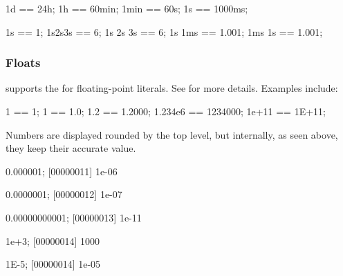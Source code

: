 \begin{urbiassert}
1d == 24h;
1h == 60min;
1min == 60s;
1s == 1000ms;

1s == 1;
1s2s3s == 6;
1s 2s 3s == 6;
1s 1ms == 1.001;
1ms 1s == 1.001;
\end{urbiassert}

\subsubsection{Floats}
\label{sec:us-syn-lit-float}

\us supports the  for floating-point
literals.  See  for more details.  Examples include:


\begin{urbiassert}
            1 == 1;
            1 == 1.0;
          1.2 == 1.2000;
      1.234e6 == 1234000;
        1e+11 == 1E+11;
\end{urbiassert}

Numbers are displayed rounded by the top level, but internally, as
seen above, they keep their accurate value.

\begin{urbiscript}
0.000001;
[00000011] 1e-06

0.0000001;
[00000012] 1e-07

0.00000000001;
[00000013] 1e-11

1e+3;
[00000014] 1000

1E-5;
[00000014] 1e-05
\end{urbiscript}

